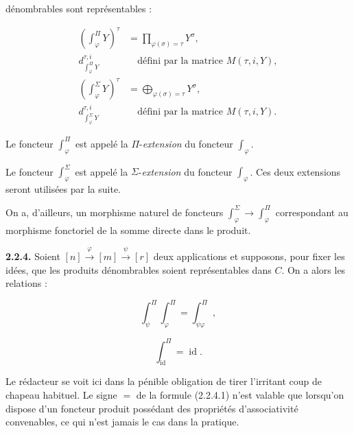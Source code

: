 %
%
dénombrables sont représentables :

\begin{equation}
  \begin{aligned}
    \left(\int_{\varphi}^{\Pi}Y\right)^{\tau}
      &=\prod_{\varphi(\sigma)=\tau}Y^{\sigma},\\
    d_{\int_{\varphi}^{\Pi}Y}^{\tau,i}
      &\quad\text{défini par la matrice }M(\tau,i,Y),\\[2pt]
    \left(\int_{\varphi}^{\Sigma}Y\right)^{\tau}
      &=\bigoplus_{\varphi(\sigma)=\tau}Y^{\sigma},\\
    d_{\int_{\varphi}^{\Sigma}Y}^{\tau,i}
      &\quad\text{défini par la matrice }M(\tau,i,Y).
  \end{aligned}
  \tag{2.2.3.3}
\end{equation}

Le foncteur $\int_{\varphi}^{\Pi}$ est appelé la
$\Pi$-\emph{extension} du foncteur $\int_\varphi$.

Le foncteur $\int_{\varphi}^{\Sigma}$ est appelé la
$\Sigma$-\emph{extension} du foncteur $\int_\varphi$. Ces deux extensions
seront utilisées par la suite.

On a, d'ailleurs, un morphisme naturel de foncteurs
$\int_{\varphi}^{\Sigma}\longrightarrow\int_{\varphi}^{\Pi}$
correspondant au morphisme fonctoriel de la somme directe dans le produit.

\noindent\textbf{2.2.4.}\quad
Soient
$[n]\xrightarrow{\varphi}[m]\xrightarrow{\psi}[r]$ deux applications et
supposons, pour fixer les idées, que les produits dénombrables soient
représentables dans $C$. On a alors les relations :

\begin{equation}
  \int_{\psi}^{\Pi}\int_{\varphi}^{\Pi}
  =\int_{\psi\varphi}^{\Pi},
  \tag{2.2.4.1}
\end{equation}

\begin{equation}
  \int_{\operatorname{id}}^{\Pi}=\operatorname{id}.
  \tag{2.2.4.2}
\end{equation}

Le rédacteur se voit ici dans la pénible obligation de tirer l'irritant coup
de chapeau habituel. Le signe $=$ de la formule (2.2.4.1) n'est valable que
lorsqu'on dispose d'un foncteur produit possédant des propriétés
d'associativité convenables, ce qui n'est jamais le cas dans la pratique.

